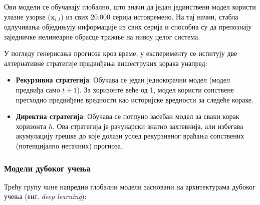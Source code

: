 \documentclass[12pt,oneside]{memoir}
\begin{document}
Ови модели се обучавају глобално, што значи да један јединствени модел користи улазне узорке ($\mathbf{x}_{i,t}$) из свих $20.000$ серија истовремено. На тај начин, стабла одлучивања обједињују информације из свих серија и способна су да препознају заједничке нелинеарне обрасце тражње на нивоу целог система. 

У погледу генерисања прогноза кроз време, у експерименту се испитују две алтернативне стратегије предвиђања вишеструких корака унапред:
\begin{itemize}
    \item \textbf{Рекурзивна стратегија}: Обучава се један једнокорачни модел (модел предвиђа само $t+1$). За хоризонте веће од 1, модел користи сопствене претходно предвиђене вредности као историјске вредности за следеће кораке.
    
    \item \textbf{Директна стратегија}: Обучава се потпуно засебан модел за сваки корак хоризонта $h$. Ова стратегија је рачунарски знатно захтевнија, али избегава акумулацију грешке до које долази услед рекурзивног враћања сопствених (потенцијално нетачних) прогноза.
\end{itemize}

\subsubsection{Модели дубоког учења}

Трећу групу чине напредни глобални модели засновани на архитектурама дубоког учења (енг. \textit{deep learning}):
\end{document}
